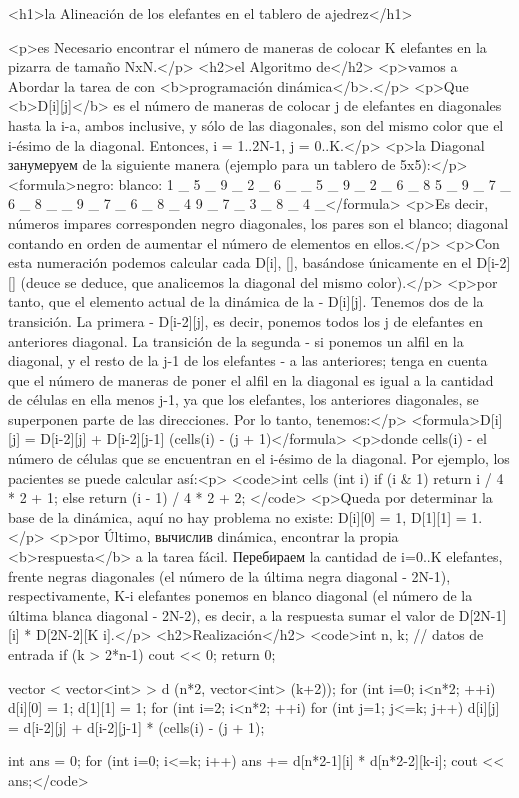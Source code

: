 <h1>la Alineación de los elefantes en el tablero de ajedrez</h1>

<p>es Necesario encontrar el número de maneras de colocar K elefantes en la pizarra de tamaño NxN.</p>
<h2>el Algoritmo de</h2>
<p>vamos a Abordar la tarea de con <b>programación dinámica</b>.</p>
<p>Que <b>D[i][j]</b> es el número de maneras de colocar j de elefantes en diagonales hasta la i-a, ambos inclusive, y sólo de las diagonales, son del mismo color que el i-ésimo de la diagonal. Entonces, i = 1..2N-1, j = 0..K.</p>
<p>la Diagonal занумеруем de la siguiente manera (ejemplo para un tablero de 5x5):</p>
<formula>negro: blanco:
1 _ 5 _ 9 _ 2 _ 6 _
_ 5 _ 9 _ 2 _ 6 _ 8
5 _ 9 _ 7 _ 6 _ 8 _ 
_ 9 _ 7 _ 6 _ 8 _ 4
9 _ 7 _ 3 _ 8 _ 4 _</formula>
<p>Es decir, números impares corresponden negro diagonales, los pares son el blanco; diagonal contando en orden de aumentar el número de elementos en ellos.</p>
<p>Con esta numeración podemos calcular cada D[i], [], basándose únicamente en el D[i-2][] (deuce se deduce, que analicemos la diagonal del mismo color).</p>
<p>por tanto, que el elemento actual de la dinámica de la - D[i][j]. Tenemos dos de la transición. La primera - D[i-2][j], es decir, ponemos todos los j de elefantes en anteriores diagonal. La transición de la segunda - si ponemos un alfil en la diagonal, y el resto de la j-1 de los elefantes - a las anteriores; tenga en cuenta que el número de maneras de poner el alfil en la diagonal es igual a la cantidad de células en ella menos j-1, ya que los elefantes, los anteriores diagonales, se superponen parte de las direcciones. Por lo tanto, tenemos:</p>
<formula>D[i][j] = D[i-2][j] + D[i-2][j-1] (cells(i) - (j + 1)</formula>
<p>donde cells(i) - el número de células que se encuentran en el i-ésimo de la diagonal. Por ejemplo, los pacientes se puede calcular así:<p>
<code>int cells (int i) {
if (i & 1)
return i / 4 * 2 + 1;
else
return (i - 1) / 4 * 2 + 2;
}</code>
<p>Queda por determinar la base de la dinámica, aquí no hay problema no existe: D[i][0] = 1, D[1][1] = 1.</p>
<p>por Último, вычислив dinámica, encontrar la propia <b>respuesta</b> a la tarea fácil. Перебираем la cantidad de i=0..K elefantes, frente negras diagonales (el número de la última negra diagonal - 2N-1), respectivamente, K-i elefantes ponemos en blanco diagonal (el número de la última blanca diagonal - 2N-2), es decir, a la respuesta sumar el valor de D[2N-1][i] * D[2N-2][K i].</p>
<h2>Realización</h2>
<code>int n, k; // datos de entrada
if (k > 2*n-1) {
cout << 0;
return 0;
}

vector < vector<int> > d (n*2, vector<int> (k+2));
for (int i=0; i<n*2; ++i)
d[i][0] = 1;
d[1][1] = 1;
for (int i=2; i<n*2; ++i)
for (int j=1; j<=k; j++)
d[i][j] = d[i-2][j] + d[i-2][j-1] * (cells(i) - (j + 1);

int ans = 0;
for (int i=0; i<=k; i++)
ans += d[n*2-1][i] * d[n*2-2][k-i];
cout << ans;</code>